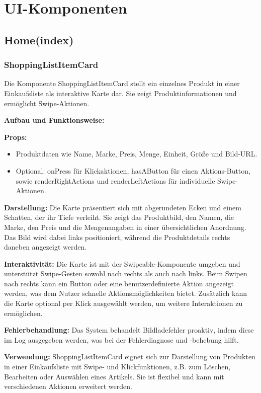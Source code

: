 \section{UI-Komponenten}
\label{sec:ui_komponenten}

\subsection{Home(index)}

\subsubsection{ShoppingListItemCard}
Die Komponente ShoppingListItemCard stellt ein einzelnes Produkt in einer Einkaufsliste als interaktive Karte dar. Sie zeigt Produktinformationen und ermöglicht Swipe-Aktionen.

\noindent\textbf{Aufbau und Funktionsweise:}

\textbf{Props:}
\begin{itemize}
    \item Produktdaten wie Name, Marke, Preis, Menge, Einheit, Größe und Bild-URL.
    \item Optional: onPress für Klickaktionen, hasAButton für einen Aktions-Button, sowie renderRightActions und renderLeftActions für individuelle Swipe-Aktionen.
\end{itemize}

\textbf{Darstellung:}
Die Karte präsentiert sich mit abgerundeten Ecken und einem Schatten, der ihr Tiefe verleiht. Sie zeigt das Produktbild, den Namen, die Marke, den Preis und die Mengenangaben in einer übersichtlichen Anordnung. Das Bild wird dabei links positioniert, während die Produktdetails rechts daneben angezeigt werden.

\textbf{Interaktivität:}
Die Karte ist mit der Swipeable-Komponente umgeben und unterstützt Swipe-Gesten sowohl nach rechts als auch nach links. Beim Swipen nach rechts kann ein Button oder eine benutzerdefinierte Aktion angezeigt werden, was dem Nutzer schnelle Aktionsmöglichkeiten bietet. Zusätzlich kann die Karte optional per Klick ausgewählt werden, um weitere Interaktionen zu ermöglichen.

\textbf{Fehlerbehandlung:}
Das System behandelt Bildladefehler proaktiv, indem diese im Log ausgegeben werden, was bei der Fehlerdiagnose und -behebung hilft.

\noindent\textbf{Verwendung:} ShoppingListItemCard eignet sich zur Darstellung von Produkten in einer Einkaufsliste mit Swipe- und Klickfunktionen, z.B. zum Löschen, Bearbeiten oder Auswählen eines Artikels. Sie ist flexibel und kann mit verschiedenen Aktionen erweitert werden.

